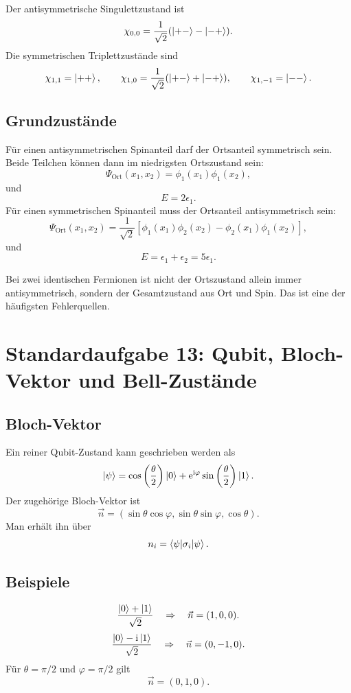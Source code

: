 Der antisymmetrische Singulettzustand ist
\[
    \chi_{0,0}=\frac{1}{\sqrt2}(\left|+ -\right\rangle-\left|- +\right\rangle).
\]
Die symmetrischen Triplettzustände sind
\[
    \chi_{1,1}=\left|++\right\rangle,
    \qquad
    \chi_{1,0}=\frac{1}{\sqrt2}(\left|+ -\right\rangle+\left|- +\right\rangle),
    \qquad
    \chi_{1,-1}=\left|--\right\rangle.
\]

\subsection{Grundzustände}

Für einen antisymmetrischen Spinanteil darf der Ortsanteil symmetrisch sein. Beide Teilchen können dann im niedrigsten Ortszustand sein:
\[
    \Psi_{\text{Ort}}(x_1,x_2)=\phi_1(x_1)\phi_1(x_2),
\]
und
\[
    E=2\epsilon_1.
\]
Für einen symmetrischen Spinanteil muss der Ortsanteil antisymmetrisch sein:
\[
    \Psi_{\text{Ort}}(x_1,x_2)=\frac{1}{\sqrt2}\left[\phi_1(x_1)\phi_2(x_2)-\phi_2(x_1)\phi_1(x_2)\right],
\]
und
\[
    E=\epsilon_1+
    \epsilon_2=5\epsilon_1.
\]

\begin{examtipbox}
Bei zwei identischen Fermionen ist nicht der Ortszustand allein immer antisymmetrisch, sondern der Gesamtzustand aus Ort und Spin. Das ist eine der häufigsten Fehlerquellen.
\end{examtipbox}

\section{Standardaufgabe 13: Qubit, Bloch-Vektor und Bell-Zustände}

\subsection{Bloch-Vektor}

Ein reiner Qubit-Zustand kann geschrieben werden als
\[
    \left|\psi\right\rangle=\cos\left(\frac{\theta}{2}\right)\left|0\right\rangle
    +\mathrm{e}^{\mathrm{i}\varphi}\sin\left(\frac{\theta}{2}\right)\left|1\right\rangle.
\]
Der zugehörige Bloch-Vektor ist
\[
    \vec n=(\sin\theta\cos\varphi,\sin\theta\sin\varphi,\cos\theta).
\]
Man erhält ihn über
\[
    n_i=\left\langle\psi\middle|\sigma_i\middle|\psi\right\rangle.
\]

\subsection{Beispiele}

\[
    \frac{\left|0\right\rangle+\left|1\right\rangle}{\sqrt2}
    \quad\Rightarrow\quad
    \vec n=(1,0,0).
\]
\[
    \frac{\left|0\right\rangle-\mathrm{i}\left|1\right\rangle}{\sqrt2}
    \quad\Rightarrow\quad
    \vec n=(0,-1,0).
\]
Für $\theta=\pi/2$ und $\varphi=\pi/2$ gilt
\[
    \vec n=(0,1,0).
\]

